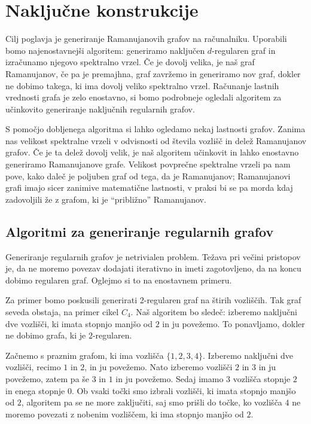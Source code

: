 \section{Naključne konstrukcije}
Cilj poglavja je generiranje Ramanujanovih grafov na računalniku. Uporabili bomo najenostavnejši algoritem: generiramo naključen \(d\)-regularen graf in izračunamo njegovo spektralno vrzel. Če je dovolj velika, je naš graf Ramanujanov, če pa je premajhna, graf zavržemo in generiramo nov graf, dokler ne dobimo takega, ki ima dovolj veliko spektralno vrzel. Računanje lastnih vrednosti grafa je zelo enostavno, si bomo podrobneje ogledali algoritem za učinkovito generiranje naključnih regularnih grafov.

S pomočjo dobljenega algoritma si lahko ogledamo nekaj lastnosti grafov. Zanima nas velikost spektralne vrzeli v odvisnosti od števila vozlišč in delež Ramanujanov grafov. Če je ta delež dovolj velik, je naš algoritem učinkovit in lahko enostavno generiramo Ramanujanove grafe. Velikost povprečne spektralne vrzeli pa nam pove, kako daleč je poljuben graf od tega, da je Ramanujanov; Ramanujanovi grafi imajo sicer zanimive matematične lastnosti, v praksi bi se pa morda kdaj zadovoljili že z grafom, ki je ``približno'' Ramanujanov.

\subsection{Algoritmi za generiranje regularnih grafov}
Generiranje regularnih grafov je netrivialen problem. Težava pri večini pristopov je, da ne moremo povezav dodajati iterativno in imeti zagotovljeno, da na koncu dobimo regularen graf. Oglejmo si to na enostavnem primeru.

\begin{primer}
    Za primer bomo poskusili generirati \(2\)-regularen graf na štirih vozliščih. Tak graf seveda obstaja, na primer cikel \(C_4\). Naš algoritem bo sledeč: izberemo naključni dve vozlišči, ki imata stopnjo manjšo od \(2\) in ju povežemo. To ponavljamo, dokler ne dobimo grafa, ki je \(2\)-regularen.

    Začnemo s praznim grafom, ki ima vozlišča \(\{1, 2, 3, 4\}\). Izberemo naključni dve vozlišči, recimo \(1\) in \(2\), in ju povežemo. Nato izberemo vozlišči \(2\) in \(3\) in ju povežemo, zatem pa še \(3\) in \(1\) in ju povežemo. Sedaj imamo \(3\) vozlišča stopnje \(2\) in enega stopnje \(0\). Ob vsaki točki smo izbrali vozlišči, ki imata stopnjo manjšo od \(2\), algoritem pa se ne more zaključiti, saj smo prišli do točke, ko vozlišča \(4\) ne moremo povezati z nobenim vozliščem, ki ima stopnjo manjšo od \(2\).
\end{primer}

